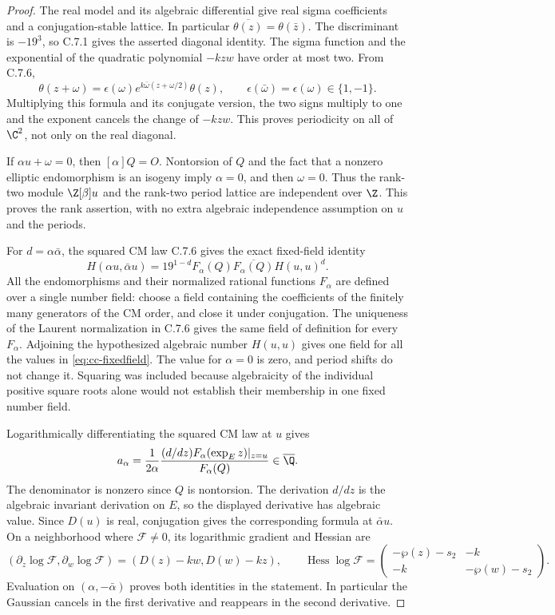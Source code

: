 \begin{proof}
The real model and its algebraic differential give real sigma
coefficients and a conjugation-stable lattice. In particular
$\overline{\theta(z)}=\theta(\bar z)$. The discriminant is
$-19^3$, so C.7.1 gives the asserted diagonal identity.
The sigma function and the exponential of the quadratic
polynomial $-kzw$ have order at most two. From C.7.6,
\[
 \theta(z+\omega)=\epsilon(\omega)
         e^{k\bar\omega(z+\omega/2)}\theta(z),
 \qquad \epsilon(\bar\omega)=\epsilon(\omega)\in\{1,-1\}.
\]
Multiplying this formula and its conjugate version, the two
signs multiply to one and the exponent cancels the change of
$-kzw$. This proves periodicity on all of $\C^2$, not only
on the real diagonal.

If $\alpha u+\omega=0$, then $[\alpha]Q=O$.
Nontorsion of $Q$ and the fact that a nonzero elliptic
endomorphism is an isogeny imply $\alpha=0$, and then
$\omega=0$. Thus the rank-two module $\Z[\beta]u$ and the
rank-two period lattice are independent over $\Z$.
This proves the rank assertion, with no extra algebraic
independence assumption on $u$ and the periods.

For $d=\alpha\bar\alpha$, the squared CM law C.7.6 gives
the exact fixed-field identity
\begin{equation}\label{eq:cc-fixedfield}
 H(\alpha u,\bar\alpha u)
   =19^{1-d}F_\alpha(Q)\overline{F_\alpha(Q)}H(u,u)^d.
\end{equation}
All the endomorphisms and their normalized rational functions
$F_\alpha$ are defined over a single number field: choose
a field containing the coefficients of the finitely many
generators of the CM order, and close it under conjugation.
The uniqueness of the Laurent normalization in C.7.6 gives
the same field of definition for every $F_\alpha$.
Adjoining the hypothesized algebraic number $H(u,u)$ gives
one field for all the values in \eqref{eq:cc-fixedfield}.
The value for $\alpha=0$ is zero, and period shifts do not
change it. Squaring was included because algebraicity of the
individual positive square roots alone would not establish
their membership in one fixed number field.

Logarithmically differentiating the squared CM law at $u$
gives
\[
 a_\alpha=\frac{1}{2\alpha}
     \frac{(d/dz)F_\alpha(\exp_Ez)|_{z=u}}{F_\alpha(Q)}
                  \in\overline{\Q}.
\]
The denominator is nonzero since $Q$ is nontorsion. The
derivation $d/dz$ is the algebraic invariant derivation on
$E$, so the displayed derivative has algebraic value.
Since $D(u)$ is real, conjugation gives the corresponding
formula at $\bar\alpha u$. On a neighborhood where
$\mathcal F\ne0$, its logarithmic gradient and Hessian are
\[
 (\partial_z\log\mathcal F,\partial_w\log\mathcal F)
       =(D(z)-kw,D(w)-kz),\qquad
 \operatorname{Hess}\log\mathcal F=
 \begin{pmatrix}-\wp(z)-s_2&-k\\-k&-\wp(w)-s_2\end{pmatrix}.
\]
Evaluation on $(\alpha,-\bar\alpha)$ proves both identities
in the statement. In particular the Gaussian cancels in the
first derivative and reappears in the second derivative.


\end{proof}
